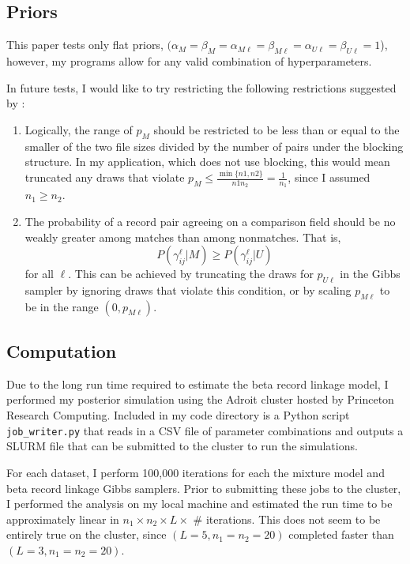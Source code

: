 \documentclass[11pt,reqno]{amsart}
\begin{document}
\subsection{Priors} This paper tests only flat priors, $(\alpha_M=\beta_M=\alpha_{M\ell}=\beta_{M\ell}=\alpha_{U\ell}=\beta_{U\ell}=1$), however, my programs allow for any valid combination of hyperparameters.  

In future tests, I would like to try restricting the following restrictions suggested by \cite{larsen_2005}:
\begin{enumerate}
\item Logically, the range of $p_M$ should be restricted to be less than or equal to the smaller of the two file sizes divided by the number of pairs under the blocking structure.  In my application, which does not use blocking, this would mean truncated any draws that violate $p_M \leq \frac{\min\{n1,n2\}}{n1n_2} = \frac{1}{n_1}$, since I assumed $n_1 \geq n_2$. 
\item The probability of a record pair agreeing on a comparison field should be no weakly greater among matches than among nonmatches.  That is, $$P(\gamma_{ij}^{\ell} | M) \geq P(\gamma_{ij}^{\ell} | U)$$ for all $\ell$.  This can be achieved by truncating the draws for $p_{U\ell}$ in the Gibbs sampler by ignoring draws that violate this condition, or by scaling $p_{M\ell}$ to be in the range $(0, p_{M\ell})$. 
\end{enumerate}

\subsection{Computation} Due to the long run time required to estimate the beta record linkage model, I performed my posterior simulation using the Adroit cluster hosted by Princeton Research Computing.   Included in my code directory is a Python script \texttt{job\_writer.py} that reads in a CSV file of parameter combinations and outputs a SLURM file that can be submitted to the cluster to run the simulations.  

For each dataset, I perform 100,000 iterations for each the mixture model and beta record linkage Gibbs samplers.  Prior to submitting these jobs to the cluster, I performed the analysis on my local machine and estimated the run time to be approximately linear in $n_1\times n_2 \times L \times $ \# iterations.  This does not seem to be entirely true on the cluster, since $(L=5, n_1 = n_2 = 20)$ completed faster than $(L=3,n_1=n_2=20)$. 
\end{document}
